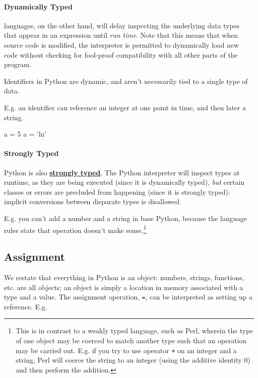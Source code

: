 \documentclass[12pt,letterpaper,twoside]{article}
\begin{document}
\begin{enumerate}
\paragraph{Dynamically Typed} languages, on the other hand, 
will delay inspecting the underlying data types that appear in an expression until \emph{run time}. Note that this means that when source code is modified,
the interpreter is permitted to dynamically load new code without checking for fool-proof compatibility with all other parts of the program.

Identifiers in Python are dynamic, and aren't necessarily tied to a single type of data.

E.g. an identifier can reference an
integer at one point in time, and then later a string.

\begin{python}
a = 5
a = 'hi'
\end{python}

\vspace{-3ex}
\paragraph{Strongly Typed} Python is also
\href{https://en.wikipedia.org/wiki/Strong_and_weak_typing#Definitions_of_%22strong%22_or_%22weak%22}{\textbf{strongly typed}}.
The Python interpreter will inspect types at runtime, as they are being
executed (since it is dynamically typed), \emph{but} certain classes or errors are precluded from happening (since it is strongly typed):
implicit conversions between disparate types is disallowed.
  
E.g. you can't add a number and a string in base Python, because the language rules state that operation doesn't make sense.\footnote{This is in contrast to a weakly typed language, such as Perl, wherein the type of one object may be coerced to match another type such that an operation may be carried out. E.g. if you try to use operator \texttt{+} on an integer and a string, Perl will coerce the string to an integer (using the additive identity 0) and then perform the addition.}

\subsection{Assignment}
\vspace{-1ex}
We restate that everything in Python is an object: numbers, strings, functions, etc. are all objects;
an object is simply a location in memory associated with a type and a value.
The assignment operation, \texttt{=}, can be interpreted as setting up a
reference. E.g.


\end{enumerate}
\end{document}
